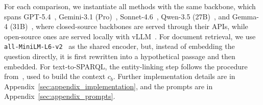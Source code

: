For each comparison, we instantiate all methods with the same backbone, which spans GPT-5.4~\citep{GPT-54}, Gemini-3.1 (Pro)~\citep{Gemini31Pro}, Sonnet-4.6~\citep{Sonnet46}, Qwen-3.5 (27B)~\citep{Qwen3.5}, and Gemma-4 (31B)~\citep{Gemma4}, where closed-source backbones are served through their APIs, while open-source ones are served locally with vLLM~\citep{vLLM}. For document retrieval, we use \texttt{all-MiniLM-L6-v2}~\citep{SBERT} as the shared encoder, but, instead of embedding the question directly, it is first rewritten into a hypothetical passage and then embedded. For text-to-SPARQL, the entity-linking step follows the procedure from~\citet{ToG}, used to build the context $c_b$. Further implementation details are in Appendix~\ref{sec:appendix_implementation}, and the prompts are in Appendix~\ref{sec:appendix_prompts}.


